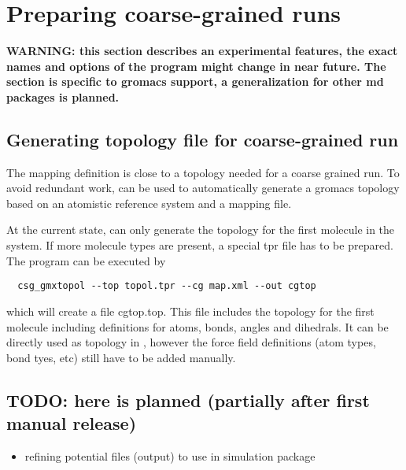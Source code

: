\chapter{Preparing coarse-grained runs}
\label{sec:usage:cgrun}
\textbf{WARNING: this section describes an experimental features, the exact names and options of the program might change in near future.  The section is specific to gromacs support, a generalization for other md packages is planned.}

\section{Generating topology file for coarse-grained run}
The mapping definition is close to a topology needed for a coarse grained run. To avoid redundant work,  can be used to automatically generate a gromacs topology based on an atomistic reference system and a mapping file.

At the current state,  can only generate the topology for the first molecule in the system. If more molecule types are present, a special tpr file has to be prepared. The program can be executed by
\begin{verbatim}
  csg_gmxtopol --top topol.tpr --cg map.xml --out cgtop
\end{verbatim}
which will create a file cgtop.top. This file includes the topology for the first molecule including definitions for atoms, bonds, angles and dihedrals. It can be directly used as topology in \gromacs , however the force field definitions (atom types, bond tyes, etc) still have to be added manually.

\section{TODO: here is planned (partially after first manual release)}
\begin{itemize}
  \item refining potential files (\votca output) to use in simulation package
\end{itemize}